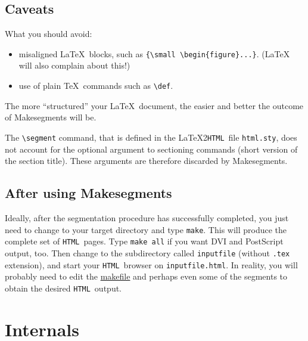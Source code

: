 \documentclass[a4paper,12pt]{article}
\newcommand{\htm}{{\tt HTML}}
\newcommand{\lhh}{{\rm \LaTeX2}\htm}
\begin{document}
\begin{description}
\end{description}

\subsection{Caveats}
\label{caveats}

What you should avoid:

\begin{itemize}
\item misaligned \LaTeX\ blocks, such as \verb:{\small \begin{figure}...}:. 
    (\LaTeX
    will also complain about this!)
\item use of plain \TeX\ commands such as \verb+\def+. 
\end{itemize} 

The more ``structured'' your \LaTeX\ document, the easier and better
the outcome of Makesegments will be.

The \verb+\segment+ command, that is
defined in the \lhh\ file \verb+html.sty+, does not account for the
optional argument to sectioning commands (short version of the section
title).  These arguments are
therefore discarded by Makesegments. 

\subsection{After using Makesegments}
\label{after}

Ideally, after the segmentation procedure has successfully completed,
you just need to change to your target directory and type
\verb:make:. This will produce the complete
set of \htm\ pages. Type \verb:make all: if you want DVI and
PostScript output, too.
 Then change to the
subdirectory called \verb:inputfile: (without \verb:.tex: extension),
and start your \htm\ browser on \verb:inputfile.html:\index{html
  output@\htm\ output}. In reality,
you will probably need to edit the  
\hyperref{Makefile}{Makefile (see }{)}{makefile} and perhaps even some of
the segments to obtain the desired \htm\ output. 

\section{Internals}
\label{internals}
\end{document}
